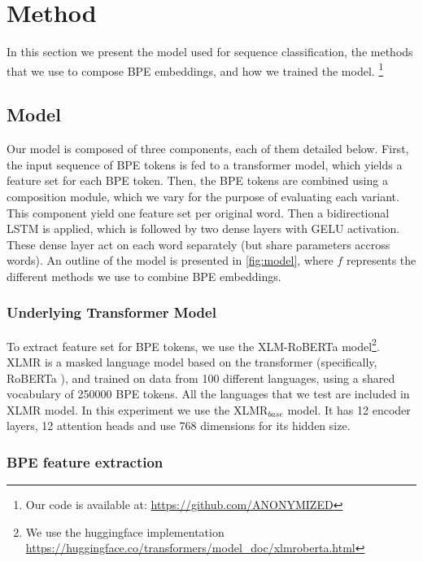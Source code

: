 \documentclass[11pt]{article}
\begin{document}
	\section{Method}
	\label{method}
    	In this section we present the model used for sequence
     classification, the methods that we use to compose BPE
     embeddings, and how we trained the model. \footnote{Our code is
     available at: \url{https://github.com/ANONYMIZED}}

	\subsection{Model}

        Our model is composed of three components, each of them
        detailed below. First, the input sequence of BPE tokens is fed
        to a transformer model, which yields a feature set for each
        BPE token. Then, the BPE tokens are combined using a
        composition module, which we vary for the purpose of
        evaluating each variant. This component yield one feature set
        per original word. Then a bidirectional LSTM is applied, which
        is followed by two dense layers with GELU
        activation. These dense layer act on each word separately (but
        share parameters accross words).  An outline of the model is
        presented in \cref{fig:model}, where $f$ represents the
        different methods we use to combine BPE embeddings.

	\subsubsection{Underlying Transformer Model}
     To extract feature set for BPE tokens, we use the
     XLM-RoBERTa \cite{conneau2019unsupervised} model\footnote{We use the
     huggingface implementation
     \url{https://huggingface.co/transformers/model_doc/xlmroberta.html}}. XLMR
     is a masked language model based on the transformer
     (specifically, RoBERTa \cite{liu2019roberta}), and trained on
     data from 100 different languages, using a shared vocabulary of
     250000 BPE tokens. All the languages that we test are included in
     XLMR model. In this experiment we use the \textsc{XLMR}$_{base}$
     model. It has 12 encoder layers, 12 attention heads and use 768
     dimensions for its hidden size.
	

	\subsubsection{BPE feature extraction}
        \label{sec:bpe-features}
\end{document}
